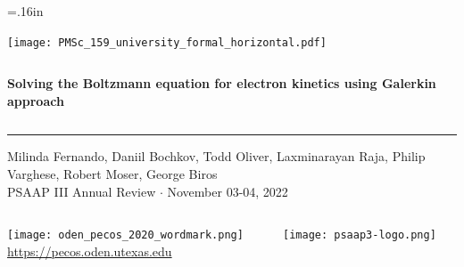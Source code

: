 \documentclass[mathserif, aspectratio=169]{beamer}
\begin{document}


\hoffset=.16in

\begin{frame}[plain,t]{}
\makeatletter
\texttt{[image: PMSc\_159\_university\_formal\_horizontal.pdf]} \newline
\begin{columns}[T,onlytextwidth]
{\bf \color{burntorange} \selectfont 
Solving the Boltzmann equation for electron kinetics using Galerkin approach
}
\end{columns}
\vspace*{.15cm}
\rule{.8\textwidth}{0.6pt} \newline

\vspace*{0.05cm}
{\selectfont
  { \scriptsize
    Milinda Fernando, Daniil Bochkov, Todd Oliver, Laxminarayan Raja, Philip Varghese, Robert Moser, George Biros  \\
  }
  {\color{burntorange} \tiny
    PSAAP III Annual Review $\cdot$ November 03-04, 2022
  }
}

\vspace*{1cm}
\begin{columns}
\begin{column}{0.8\linewidth}
\texttt{[image: oden\_pecos\_2020\_wordmark.png]}\\
{\scriptsize \url{https://pecos.oden.utexas.edu}}
\end{column}

\begin{column}{0.2\linewidth}
\texttt{[image: psaap3-logo.png]}
\end{column}
\end{columns}

\end{frame}
\hoffset=0in
\end{document}
